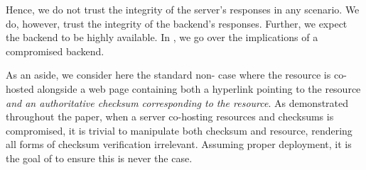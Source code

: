 Hence, we do not trust the integrity of the server's responses in any scenario.
We do, however, trust the integrity of the backend's responses. Further, we
expect the backend to be highly available. In , we go over
the implications of a compromised backend.

As an aside, we consider here the standard non-\SYSTEM{} case where the resource
is co-hosted alongside a web page containing both a hyperlink pointing to the
resource \emph{and an authoritative checksum corresponding to the resource}. As
demonstrated throughout the paper, when a server co-hosting resources and
checksums is compromised, it is trivial to manipulate both checksum and
resource, rendering all forms of checksum verification irrelevant. Assuming
proper deployment, it is the goal of \SYSTEM{} to ensure this is never the case.
